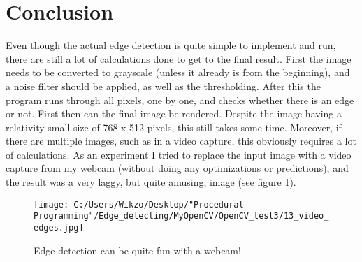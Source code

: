 \section{Conclusion}
Even though the actual edge detection is quite simple to implement and run, there are still a lot of calculations done to get to the final result. First the image needs to be converted to grayscale (unless it already is from the beginning), and a noise filter should be applied, as well as the thresholding. After this the program runs through all pixels, one by one, and checks whether there is an edge or not. First then can the final image be rendered. Despite the image having a relativity small size of 768 x 512 pixels, this still takes some time. Moreover, if there are multiple images, such as in a video capture, this obviously requires a lot of calculations. As an experiment I tried to replace the input image with a video capture from my webcam (without doing any optimizations or predictions), and the result was a very laggy, but quite amusing, image (see figure \ref{video_edge}).

\begin{figure} [htbp]
\texttt{[image: C:/Users/Wikzo/Desktop/"Procedural Programming"/Edge\_detecting/MyOpenCV/OpenCV\_test3/13\_video\_edges.jpg]}
\centering
\caption{Edge detection can be quite fun with a webcam!}
\label{video_edge}
\end{figure}